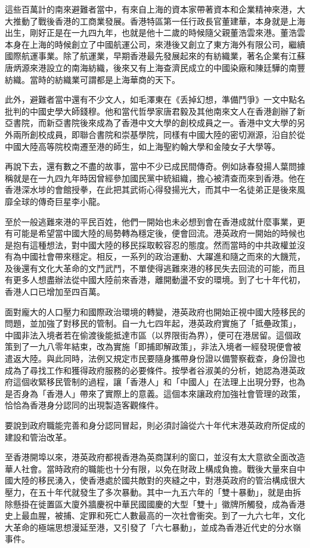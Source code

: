 這些百萬計的南來避難者當中，有來自上海的資本家帶著資本和企業精神來港，大大推動了戰後香港的工商業發展。香港特區第一任行政長官董建華，本身就是上海出生，剛好正是在一九四九年，也就是他十二歲的時候隨父親董浩雲來港。董浩雲本身在上海的時候創立了中國航運公司，來港後又創立了東方海外有限公司，繼續國際航運事業。除了航運業，早期香港最先發展起來的有紡織業，著名企業有江蘇唐炳源來港設立的南海紡織，後來又有上海查濟民成立的中國染廠和陳廷驊的南豐紡織。當時的紡織業可謂都是上海華商的天下。

此外，避難者當中還有不少文人，如毛澤東在《丢掉幻想，準備鬥爭》一文中點名批判的中國史學大師錢穆。他和當代哲學家唐君毅及其他南來文人在香港創辦了新亞書院，而新亞書院後來成為了香港中文大學的創校成員之一。香港中文大學的另外兩所創校成員，即聯合書院和崇基學院，同樣有中國大陸的密切淵源，沿自於從中國大陸高等院校南遷至港的師生，如上海聖約翰大學和金陵女子大學等。

再說下去，還有數之不盡的故事，當中不少已成民間傳奇。例如詠春發揚人葉問據稱就是在一九四九年時因曾經參加國民黨中統組織，擔心被清查而來到香港。他在香港深水埗的會館授拳，在此把其武術心得發揚光大，而其中一名徒弟正是後來風靡全球的傳奇巨星李小龍。

至於一般逃難來港的平民百姓，他們一開始也未必想到會在香港成就什麼事業，更有可能是希望當中國大陸的局勢轉為穩定後，便會回流。港英政府一開始的時候也是抱有這種想法，對中國大陸的移民採取較容忍的態度。然而當時的中共政權並沒有為中國社會帶來穩定。相反，一系列的政治運動、大躍進和隨之而來的大饑荒，及後還有文化大革命的文鬥武鬥，不單使得逃難來港的移民失去回流的可能，而且有更多人想盡辦法從中國大陸前來香港，離開動盪不安的環境。到了七十年代初，香港人口已增加至四百萬。

面對龐大的人口壓力和國際政治環境的轉變，港英政府也開始正視中國大陸移民的問題，並加強了對移民的管制。自一九七四年起，港英政府實施了「抵壘政策」，中國非法入境者若在偷渡後能抵達市區（以界限街為界），便可在港居留。這個政策到了一九八零年結束，改為實施「即捕即解政策」，非法入境者一經發現便會被遣返大陸。與此同時，法例又規定市民要隨身攜帶身份證以備警察截查，身份證也成為了尋找工作和獲得政府服務的必要條件。按學者谷淑美的分析，她認為港英政府這個收緊移民管制的過程，讓「香港人」和「中國人」在法理上出現分野，也為是否身為「香港人」帶來了實際上的意義。這個本來讓政府加強社會管理的政策，恰恰為香港身分認同的出現製造客觀條件。

要說到政府職能完善和身分認同冒起，則必須討論從六十年代末港英政府所促成的建設和管治改革。

至香港開埠以來，港英政府都視香港為英商謀利的窗口，並沒有太大意欲全面改造華人社會。當時政府的職能也十分有限，以免在財政上構成負擔。戰後大量來自中國大陸的移民湧入，使香港處於國共敵對的夾縫之中，對港英政府的管治構成很大壓力，在五十年代就發生了多次暴動。其中一九五六年的「雙十暴動」，就是由拆除懸掛在徙置區大廈外牆慶祝中華民國國慶的大型「雙十」徽牌所觸發，成為香港史上最血腥，被捕、定罪和死亡人數最高的一次社會衝突。到了一九六七年，文化大革命的極端思想漫延至港，又引發了「六七暴動」，並成為香港近代史的分水嶺事件。

